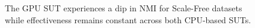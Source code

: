     
    \begin{figure}[htbp]
        \begin{center}
            
            \caption{The \acs{GPU} \acs{SUT} experiences a dip in \acs{NMI} for Scale-Free datasets while effectiveness remains constant across both \acs{CPU}-based \acs{SUT}s.}
            \label{Figure:results-static-nmi}
        \end{center}
    \end{figure}

